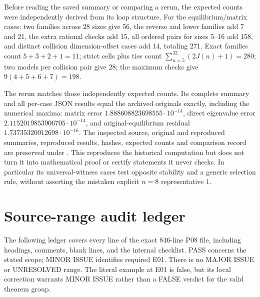 \documentclass[11pt]{article}
\begin{document}
Before reading the saved summary or comparing a rerun, the expected
counts were independently derived from its loop structure. For the
equilibrium/matrix cases: two families across 28 sizes give 56, the
reverse and lower families add 7 and 21, the extra rational checks add
15, all ordered pairs for sizes 5--16 add 158, and distinct collision
dimension-offset cases add 14, totaling 271. Exact families count
$5+3+2+1=11$; strict cells plus ties count
$\sum_{n=5}^{32}(2J(n)+1)=280$; two models per collision pair give
28; the maximum checks give $9(4+5+6+7)=198$.

The rerun matches those independently expected counts. Its complete
summary and all per-case JSON results equal the archived originals
exactly, including the numerical maxima: matrix error
$1.888608823698555\cdot10^{-14}$, direct eigenvalue error
$2.1152019853906705\cdot10^{-14}$, and original-equilibrium residual
$1.73735320012698\cdot10^{-16}$. The inspected source, original and
reproduced summaries, reproduced results, hashes, expected counts and
comparison record are preserved under
. This reproduces the historical
computation but does not turn it into mathematical proof or certify
statements it never checks. In particular its universal-witness cases
test opposite stability and a generic selection rule, without asserting
the mistaken explicit $n=8$ representative $1$.

\section{Source-range audit ledger}
The following ledger covers every line of the exact 846-line P08 file,
including headings, comments, blank lines, and the internal checklist.
PASS concerns the stated scope; MINOR ISSUE identifies required E01.
There is no MAJOR ISSUE or UNRESOLVED range. The literal example
at E01 is false, but its local correction warrants MINOR ISSUE rather
than a FALSE verdict for the valid theorem group.
\end{document}
